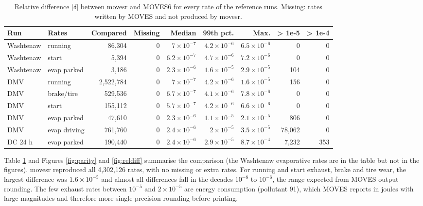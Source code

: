 \documentclass[preprint,
3p]{elsarticle} %
\begin{document}
\begin{table}

\caption{\label{tab:parity-table}Relative difference $|\delta|$ between movesr and MOVES6 for every rate of the reference runs. Missing: rates written by MOVES and not produced by movesr. \label{tab:parity}}
\centering
\begin{tabular}[t]{llrrrrrrr}
\toprule
Run & Rates & Compared & Missing & Median & 99th pct. & Max. & > 1e-5 & > 1e-4\\
\midrule
Washtenaw & running & 86,304 & 0 & $7 \times 10^{-7}$ & $4.2 \times 10^{-6}$ & $6.5 \times 10^{-6}$ & 0 & 0\\
Washtenaw & start & 5,394 & 0 & $6.2 \times 10^{-7}$ & $4.7 \times 10^{-6}$ & $7.2 \times 10^{-6}$ & 0 & 0\\
Washtenaw & evap parked & 3,186 & 0 & $2.3 \times 10^{-6}$ & $1.6 \times 10^{-5}$ & $2.9 \times 10^{-5}$ & 104 & 0\\
DMV & running & 2,522,784 & 0 & $7 \times 10^{-7}$ & $4.2 \times 10^{-6}$ & $1.6 \times 10^{-5}$ & 156 & 0\\
DMV & brake/tire & 529,536 & 0 & $6.7 \times 10^{-7}$ & $4.1 \times 10^{-6}$ & $7.8 \times 10^{-6}$ & 0 & 0\\
DMV & start & 155,112 & 0 & $5.7 \times 10^{-7}$ & $4.2 \times 10^{-6}$ & $6.6 \times 10^{-6}$ & 0 & 0\\
DMV & evap parked & 47,610 & 0 & $2.3 \times 10^{-6}$ & $1.1 \times 10^{-5}$ & $2.1 \times 10^{-5}$ & 806 & 0\\
DMV & evap driving & 761,760 & 0 & $2.4 \times 10^{-6}$ & $2 \times 10^{-5}$ & $3.5 \times 10^{-5}$ & 78,062 & 0\\
DC 24 h & evap parked & 190,440 & 0 & $2.4 \times 10^{-6}$ & $2.9 \times 10^{-5}$ & $8.7 \times 10^{-4}$ & 7,232 & 353\\
\bottomrule
\end{tabular}
\end{table}

Table \ref{tab:parity} and Figures \ref{fig:parity} and
\ref{fig:reldiff} summarise the comparison (the Washtenaw evaporative
rates are in the table but not in the figures). movesr reproduced all
4,302,126 rates, with no missing or extra rates. For running and start
exhaust, brake and tire wear, the largest difference was
\(1.6 \times 10^{-5}\) and almost all differences fall in the decades
\(10^{-8}\) to \(10^{-6}\), the range expected from MOVES output
rounding. The few exhaust rates between \(10^{-5}\) and
\(2\times10^{-5}\) are energy consumption (pollutant 91), which MOVES
reports in joules with large magnitudes and therefore more
single-precision rounding before printing.
\end{document}
